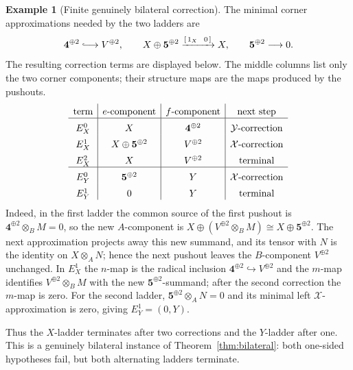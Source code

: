 \documentclass[11pt,reqno]{amsart}
\theoremstyle{definition}
\newtheorem{example}[theorem]{Example}
\theoremstyle{remark}
\numberwithin{equation}{section}
\begin{document}
\begin{example}[Finite genuinely bilateral correction]
The minimal corner approximations needed by the two ladders are
\[
 \mathbf4^{\oplus2}\lhook\joinrel\longrightarrow V^{\oplus2},
 \qquad
 X\oplus\mathbf5^{\oplus2}
   \xrightarrow{[\,1_X\ \ 0\,]}X,
 \qquad
 \mathbf5^{\oplus2}\longrightarrow0.
\]
The resulting correction terms are displayed below.  The middle columns
list only the two corner components; their structure maps are the maps
produced by the pushouts.
\[
\begin{array}{c|c|c|c}
 \text{term}&e\text{-component}&f\text{-component}&\text{next step}
 \rule{0pt}{2.6ex}\\ \hline
 E_X^0&X&\mathbf4^{\oplus2}&\mathcal Y\text{-correction}
 \rule{0pt}{3.1ex}\\
 E_X^1&X\oplus\mathbf5^{\oplus2}&V^{\oplus2}
      &\mathcal X\text{-correction}\rule{0pt}{3.1ex}\\
 E_X^2&X&V^{\oplus2}&\text{terminal}\rule{0pt}{3.1ex}\\ \hline
 E_Y^0&\mathbf5^{\oplus2}&Y&\mathcal X\text{-correction}
 \rule{0pt}{3.1ex}\\
 E_Y^1&0&Y&\text{terminal}\rule{0pt}{3.1ex}
\end{array}
\]
Indeed, in the first ladder the common source of the first pushout is
$\mathbf4^{\oplus2}\otimes_BM=0$, so the new $A$-component is
$X\oplus(V^{\oplus2}\otimes_BM)\cong X\oplus\mathbf5^{\oplus2}$.
The next approximation projects away this new summand, and its tensor with
$N$ is the identity on $X\otimes_AN$; hence the next pushout leaves the
$B$-component $V^{\oplus2}$ unchanged.  In $E_X^1$ the $n$-map is the
radical inclusion $\mathbf4^{\oplus2}\hookrightarrow V^{\oplus2}$ and the
$m$-map identifies $V^{\oplus2}\otimes_BM$ with the new
$\mathbf5^{\oplus2}$-summand; after the second correction the $m$-map is
zero.  For the second ladder,
$\mathbf5^{\oplus2}\otimes_AN=0$ and its minimal left
$\mathcal X$-approximation is zero, giving $E_Y^1=(0,Y)$.

Thus the $X$-ladder terminates after two corrections and the $Y$-ladder
after one.  This is a genuinely bilateral instance of
Theorem~\ref{thm:bilateral}: both one-sided hypotheses fail, but both
alternating ladders terminate.


\end{example}
\end{document}
